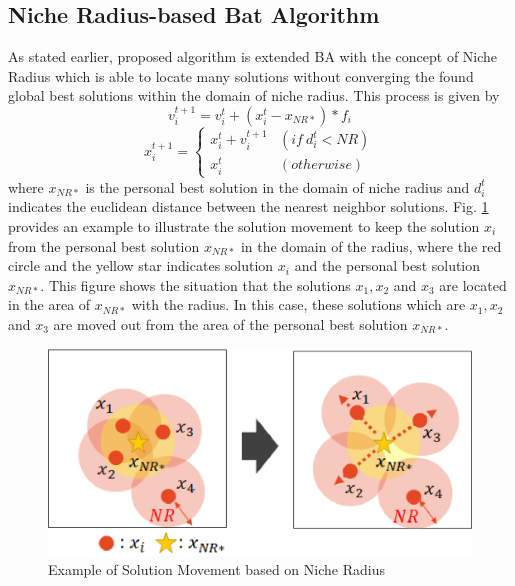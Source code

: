 \documentclass[conference]{IEEEtran}
\begin{document}
\subsection{Niche Radius-based Bat Algorithm}
As stated earlier, proposed algorithm is extended BA with the concept of Niche Radius which is able to locate many solutions without converging the found global best solutions within the domain of niche radius. This process is given by
\begin{equation}
\label{eq:nrvi}
v_i^{t+1}=v_i^t+(x_i^t-x_{NR*})*f_i
\end{equation}
\begin{equation}
\label{eq:nrxi}
x_i^{t+1}= \begin{cases}
x_i^t+v_i^{t+1} & (if \ d_i^t < NR) \\
x_i^t & (otherwise)
\end{cases}
\end{equation}
where $x_{NR*}$ is the personal best solution in the domain of niche radius and $d_i^t$ indicates the euclidean distance between the nearest neighbor solutions. Fig. \ref{fig:niche} provides an example to illustrate the solution movement to keep the solution $x_i$ from the personal best solution $x_{NR*}$ in the domain of the radius, where the red circle and the yellow star indicates solution $x_i$ and the personal best solution $x_{NR*}$. This figure shows the situation that the solutions $x_1, x_2 $ and $ x_3$ are located in the area of $x_{NR*}$ with the radius. In this case, these solutions which are $x_1, x_2$and $x_3$ are moved out from the area of the personal best solution $x_{NR*}$.

\begin{figure}[h]
\begin{center}
\includegraphics[width=0.8\linewidth]{eps/niche.eps}
\end{center}
\caption{Example of Solution Movement based on Niche Radius}
\label{fig:niche}
\end{figure}
\end{document}
